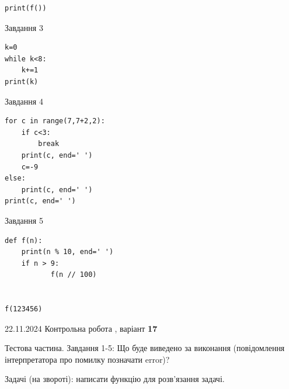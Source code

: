 \documentclass[12pt, ukrainian]{article}
\begin{document}
{{{{{{{{{{{{{{{{\begin{minipage}[t]{8.5cm}
\begin{verbatim}
print(f())
\end{verbatim}


\vspace{5mm}
               
{\begin{center}Завдання {3}\end{center}}
\vspace{-6mm}

\begin{verbatim}
k=0
while k<8:
    k+=1
print(k)
\end{verbatim}


\end{minipage}
\vline \hspace{6mm}
\begin{minipage}[t]{10.7cm}
               
{\begin{center}Завдання {4}\end{center}}
\vspace{-6mm}

\begin{verbatim}
for c in range(7,7+2,2):
    if c<3:
        break
    print(c, end=' ')
    c=-9
else:
    print(c, end=' ')
print(c, end=' ')
\end{verbatim}


\vspace{5mm}
               
{\begin{center}Завдання {5}\end{center}}
\vspace{-6mm}

\begin{verbatim}
def f(n):
    print(n % 10, end=' ')
    if n > 9:
           f(n // 100)
    

f(123456)
\end{verbatim}


\end{minipage}

\newpage

{{22.11.2024 Контрольна робота , варіант  \No \textbf { 17 }\par}}
{

Тестова частина. Завдання 1-5: Що буде виведено за виконання (повідомлення інтерпретатора про помилку позначати error)?

Задачі (на звороті): написати функцію для розв'язання задачі.

\vspace{5mm} \begin{minipage}[t]{8.5cm}
               

\end{minipage}}}}}}}}}}}}}}}}}}
\end{document}
